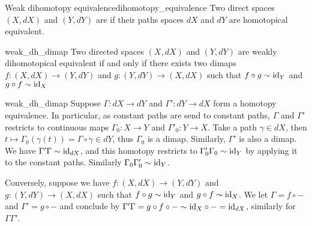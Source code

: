 \begin{cdef}{Weak dihomotopy equivalence}{dihomotopy_equivalence}
    Two direct spaces \( (X, dX) \) and \( (Y, dY) \) are  if their paths spaces \( dX \) and \( dY \) are homotopical equivalent.
\end{cdef}
\begin{cprop}{}{weak_dh_dimap}
    Two directed spaces \( (X, dX) \) and \( (Y, dY) \) are weakly dihomotopical equivalent if and only if there exists two dimaps \( f : (X, dX) \to (Y, dY) \) and \( g : (Y, dY) \to (X, dX) \) such that \( f\circ g \sim \mathrm{id}_Y \) and \( g\circ f \sim \mathrm{id}_X \)
\end{cprop}
\begin{propproof}{weak_dh_dimap}
   Suppose \( \Gamma : dX \to dY \) and \( \Gamma' : dY \to dX \) form a homotopy equivalence. In particular, as constant paths are send to constant paths, \( \Gamma \) and \( \Gamma' \) restricts to continuous maps \( \Gamma_0 : X \to Y \) and \( \Gamma'_0 : Y \to X \). Take a path \( \gamma \in dX \), then \( t \mapsto \Gamma_0 (\gamma(t)) = \Gamma \circ \gamma \in dY \), thus \( \Gamma_0 \) is a dimap. Similarly, \( \Gamma' \) is also a dimap. We have \( \Gamma'\Gamma \sim \mathrm{id}_{dX} \), and this homotopy restricts to \( \Gamma'_0\Gamma_0 \sim \mathrm{id}_Y \) by applying it to the constant paths. Similarly \( \Gamma_0\Gamma'_0 \sim \mathrm{id}_Y \).
    
    Conversely, suppose we have \( f : (X, dX) \to (Y, dY) \) and \( g : (Y, dY) \to (X, dX) \) such that \( f\circ g \sim \mathrm{id}_Y \) and \( g\circ f \sim \mathrm{id}_X \). We let \( \Gamma = f\circ - \) and \( \Gamma' = g\circ - \) and conclude by \( \Gamma'\Gamma = g \circ f \circ - \sim \mathrm{id}_X \circ - = \mathrm{id}_{dX} \), similarly for \( \Gamma\Gamma' \).
\end{propproof}



    

